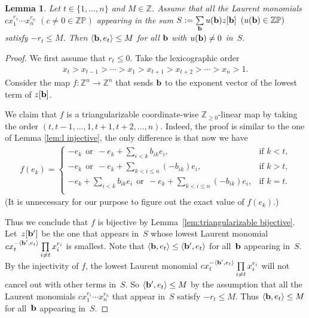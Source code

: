 \documentclass[pdftex]{sigma}
\numberwithin{equation}{section}
\newtheorem{Lemma}[Theorem]{Lemma}
\begin{document}
\begin{Lemma}\label{supportofS}
Let $t\in\{1,\dots,n\}$ and  $M\in\mathbb{Z}$.
Assume that all the Laurent monomials $cx_1^{r_1}\cdots x_n^{r_n}$ $(c\neq0\in\mathbb{ZP})$ appearing in the sum $S:=\sum\limits_{\bf b} u({\bf b}) z[{\bf b}] $ $(u({\bf b}) \in \mathbb{ZP})$ satisfy $-r_t\le M$. Then $\langle{\bf b},e_t\rangle\le M$ for all ${\bf b}$ with $u({\bf b})\neq 0$ in~$S$.
\end{Lemma}

\begin{proof}
We f\/irst assume that $r_t\le 0$.
Take the lexicographic order
\begin{gather*}
x_t>x_{t-1}>\cdots >x_1>x_{t+1}>x_{t+2}>\cdots>x_n>1.
\end{gather*}
Consider the map  $f\colon \mathbb{Z}^n\to\mathbb{Z}^n$ that sends ${\bf b}$ to the  exponent vector of the lowest term of $z[{\bf b}]$.

We claim that $f$ is a triangularizable coordinate-wise $\mathbb{Z}_{\ge0}$-linear map by taking the order $(t,t-1,\dots,1,t+1,t+2,\dots,n)$. Indeed,  the proof is similar to the one of Lemma \ref{lem:l injective}, the only dif\/ference is that now we have{\samepage
\begin{gather*} f(e_k)=\begin{cases}
\displaystyle -e_k \ \ \text{or} \ \ -e_k+\sum_{i<k}b_{ik}e_i, & \text{if $k<t$,} \\
\displaystyle -e_k \ \ \text{or} \ \  -e_k+\sum_{k<i\le n}(-b_{ik})e_i, & \text{if $k>t$,}  \\
\displaystyle -e_k+\sum_{i<k}b_{ik}e_i \ \ \text{or} \ \   -e_k+\sum_{k<i\le n}(-b_{ik})e_i , & \text{if $k=t$.} \\
\end{cases}
\end{gather*}
(It is unnecessary for our purpose to f\/igure out the exact value of $f(e_k)$.)}

Thus we conclude that $f$ is bijective by Lemma~\ref{lem:triangularizable bijective}.
Let~$z[{\bf b}']$ be the one that appears in~$S$ whose lowest Laurent monomial $cx_t^{-\langle{\bf b}',e_t\rangle}\prod\limits_{i\neq t} x_i^{r_i}$ is smallest. Note that $\langle{\bf b},e_t\rangle\le\langle{\bf b}',e_t\rangle$ for all~${\bf b}$ appearing in~$S$. By the injectivity of $f$, the lowest Laurent monomial $cx_t^{-\langle{\bf b}',e_t\rangle}\prod\limits_{i\neq t} x_i^{r_i}$ will not  cancel out with other terms in~$S$. So $\langle{\bf b}',e_t\rangle\le M$ by the assumption that all the Laurent monomials $cx_1^{r_1}\cdots x_n^{r_n}$ that appear in~$S$ satisfy $-r_t\le M$. Thus $\langle{\bf b},e_t\rangle\le M$ for all~${\bf b}$ appearing in~$S$.
\end{proof}
\end{document}
